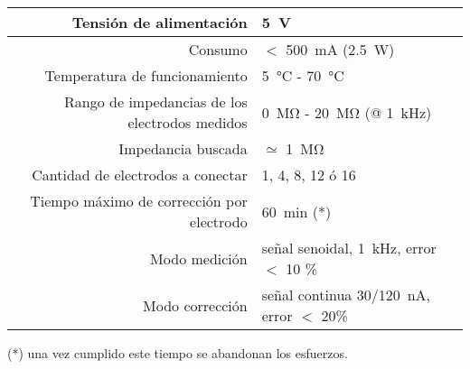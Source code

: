 \begin{table}[H]
\begin{center}
\begin{tabular}{|r|l|}
    \hline
    Tensión de alimentación &
    \SI{5}{\volt} \\ \hline
    Consumo &
    $<$ \SI{500}{\milli\ampere} (\SI{2.5}{\watt}) \\ \hline
    Temperatura de funcionamiento &
    \SI{5}{\celsius} - \SI{70}{\celsius} \\ \hline
    Rango de impedancias de los electrodos medidos &
    \SI{0}{\mega\ohm} - \SI{20}{\mega\ohm} (@ \SI{1}{\kilo\hertz})\\ \hline
    Impedancia buscada & $\simeq$ \SI{1}{\mega\ohm}\\ \hline
    Cantidad de electrodos a conectar &
    1, 4, 8, 12 ó 16 \\ \hline
    Tiempo máximo de corrección por electrodo &
    \SI{60}{\minute} (*)\\ \hline
    Modo medición & señal senoidal, \SI{1}{\kilo\hertz}, error $<$ 10 \% \\ \hline
    Modo corrección & señal continua \SI{30/120}{\nano\ampere}, error $<$ 20\% \\ \hline
\end{tabular}
\end{center}
\end{table}

(*) una vez cumplido este tiempo se abandonan los esfuerzos.


